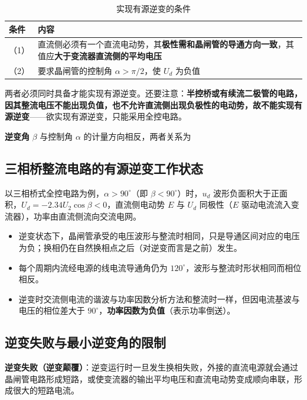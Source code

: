\begin{table}[htbp]
\centering
\caption{实现有源逆变的条件}
\label{tab:3-4}
\begin{tabular}{p{1.2cm}p{13.4cm}}
\toprule
\textbf{条件} & \textbf{内容} \\
\midrule
（1） & 直流侧必须有一个直流电动势，其\textbf{极性需和晶闸管的导通方向一致}，其值应\textbf{大于变流器直流侧的平均电压} \\
（2） & 要求晶闸管的控制角 $\alpha>\pi/2$，使 $U_d$ 为负值 \\
\bottomrule
\end{tabular}
\end{table}

两者必须同时具备才能实现有源逆变。还要注意：\textbf{半控桥或有续流二极管的电路，因其整流电压不能出现负值，也不允许直流侧出现负极性的电动势，故不能实现有源逆变}——欲实现有源逆变，只能采用全控电路。

\textbf{逆变角} $\beta$ 与控制角 $\alpha$ 的计量方向相反，两者关系为


\subsection{三相桥整流电路的有源逆变工作状态}

以三相桥式全控电路为例，$\alpha>90^\circ$（即 $\beta<90^\circ$）时，$u_d$ 波形负面积大于正面积，$U_d=-2.34U_2\cos\beta<0$，直流侧电动势 $E$ 与 $U_d$ 同极性（$E$ 驱动电流流入变流器），功率由直流侧流向交流电网。

\begin{itemize}
  \item 逆变状态下，晶闸管承受的电压波形与整流时相同，只是导通区间对应的电压为负；换相仍在自然换相点之后（对逆变而言是之前）发生。
  \item 每个周期内流经电源的线电流导通角仍为 $120^\circ$，波形与整流时形状相同而相位相反。
  \item 逆变时交流侧电流的谐波与功率因数分析方法和整流时一样，但因电流基波与电压的相位差大于 $90^\circ$，\textbf{功率因数为负值}（表示功率倒送）。
\end{itemize}

\subsection{逆变失败与最小逆变角的限制}

\textbf{逆变失败（逆变颠覆）}：逆变运行时一旦发生换相失败，外接的直流电源就会通过晶闸管电路形成短路，或使变流器的输出平均电压和直流电动势变成顺向串联，形成很大的短路电流。

